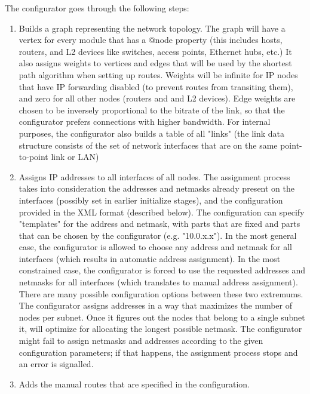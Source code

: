 The configurator goes through the following steps:
\begin{enumerate}
  \item  Builds a graph representing the network topology. The graph
     will have a vertex for every module that has a @node property (this
     includes hosts, routers, and L2 devices like switches, access points,
     Ethernet hubs, etc.) It also assigns weights to vertices and edges that
     will be used by the shortest path algorithm when setting up routes.
     Weights will be infinite for IP nodes that have IP forwarding disabled
     (to prevent routes from transiting them), and zero for all other nodes
     (routers and and L2 devices). Edge weights are chosen to be inversely
     proportional to the bitrate of the link, so that the configurator
     prefers connections with higher bandwidth. For internal purposes,
     the configurator also builds a table of all "links" (the link data
     structure consists of the set of network interfaces that are
     on the same point-to-point link or LAN)

  \item  Assigns IP addresses to all interfaces of all nodes. The
     assignment process takes into consideration the addresses and netmasks
     already present on the interfaces (possibly set in earlier initialize
     stages), and the configuration provided in the XML format (described
     below). The configuration can specify "templates" for the address
     and netmask, with parts that are fixed and parts that can be chosen
     by the configurator (e.g. "10.0.x.x"). In the most general case,
     the configurator is allowed to choose any address and netmask for all
     interfaces (which results in automatic address assignment). In the most
     constrained case, the configurator is forced to use the requested addresses
     and netmasks for all interfaces (which translates to manual address assignment).
     There are many possible configuration options between these two extremums. The
     configurator assigns addresses in a way that maximizes the number of
     nodes per subnet. Once it figures out the nodes that belong to a single
     subnet it, will optimize for allocating the longest possible netmask.
     The configurator might fail to assign netmasks and addresses according
     to the given configuration parameters; if that happens, the assignment
     process stops and an error is signalled.

  \item  Adds the manual routes that are specified in the configuration.


\end{enumerate}
